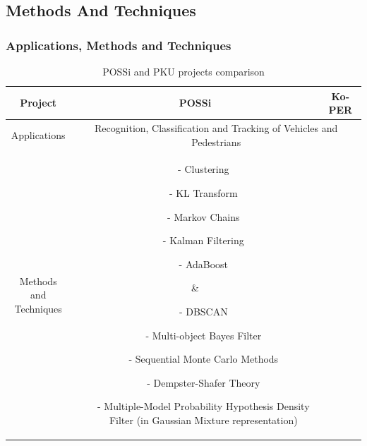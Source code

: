 \documentclass[table]{beamer}
\begin{document}
\subsection*{Methods And Techniques}
\frame
{
	\frametitle{Applications, Methods and Techniques}
	
	\scriptsize{
	\begin{table}	
	\begin{tabular}{|c|c|c|}
	\hline
	Project & POSSi & Ko-PER \\
	\hline
	Applications & \multicolumn{2}{c|}{\parbox{6cm}{Recognition, Classification and Tracking of Vehicles and Pedestrians}} \\
	\hline
	\parbox{2.5cm}{Methods and \\Techniques}
	& \parbox{2.5cm}{\begin{itemize}[leftmargin=.07in]
		\item[-] Clustering
		\item[-] KL Transform
		\item[-] Markov Chains
		\item[-] Kalman Filtering
		\item[-] AdaBoost
	\end{itemize}
	}
	& \parbox{3.5cm}{
	\begin{itemize}[leftmargin=.07in]
		\item[-] DBSCAN
		\item[-] Multi-object Bayes Filter
		\item[-] Sequential Monte Carlo Methods
		\item[-] Dempster-Shafer Theory
		\item[-] Multiple-Model Probability Hypothesis Density Filter (in Gaussian Mixture representation)
	\end{itemize}
	}\\
	\hline
	
	\end{tabular}
	\caption{POSSi and PKU projects comparison}	
	\end{table}
	}
}
\end{document}
